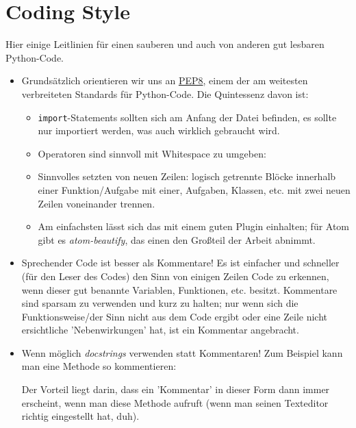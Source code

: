 \def\code#1{\texttt{#1}}
\lstset{language=Python}

\section{Coding Style}
\label{sec:cs}

Hier einige Leitlinien für einen sauberen und auch von anderen gut lesbaren Python-Code.

\begin{itemize}
	\item Grundsätzlich orientieren wir uns an \href{http://legacy.python.org/dev/peps/pep-0008/#introduction}{PEP8}, einem der am weitesten verbreiteten Standards für Python-Code. Die Quintessenz davon ist:
	\begin{itemize}
		\item \code{import}-Statements sollten sich am Anfang der Datei befinden, es sollte nur importiert werden, was auch wirklich gebraucht wird.

		\item Operatoren sind sinnvoll mit Whitespace zu umgeben:
		

		\item Sinnvolles setzten von neuen Zeilen: logisch getrennte Blöcke innerhalb einer Funktion/Aufgabe mit einer, Aufgaben, Klassen, etc. mit zwei neuen Zeilen voneinander trennen.

		\item Am einfachsten lässt sich das mit einem guten Plugin einhalten; für Atom gibt es \emph{atom-beautify}, das einen den Großteil der Arbeit abnimmt.
	\end{itemize}

	\item Sprechender Code ist besser als Kommentare! Es ist einfacher und schneller (für den Leser des Codes) den Sinn von einigen Zeilen Code zu erkennen, wenn dieser gut benannte Variablen, Funktionen, etc. besitzt. Kommentare sind sparsam zu verwenden und kurz zu halten; nur wenn sich die Funktionsweise/der Sinn nicht aus dem Code ergibt oder eine Zeile nicht ersichtliche 'Nebenwirkungen' hat, ist ein Kommentar angebracht.

	\item Wenn möglich \emph{docstrings} verwenden statt Kommentaren! Zum Beispiel kann man eine Methode so kommentieren:
	
	Der Vorteil liegt darin, dass ein 'Kommentar' in dieser Form dann immer erscheint, wenn man diese Methode aufruft (wenn man seinen Texteditor richtig eingestellt hat, duh).


\end{itemize}
